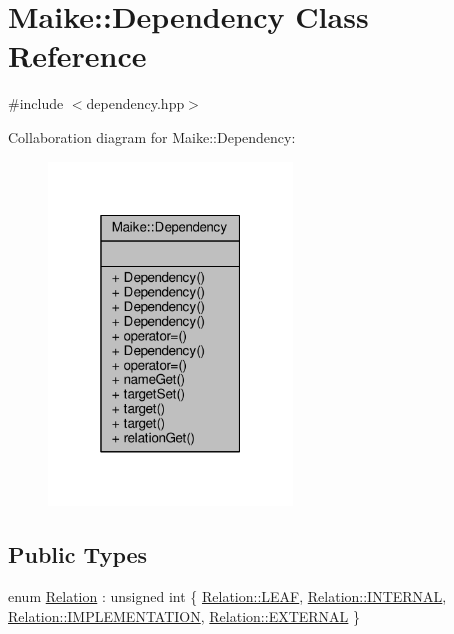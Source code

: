 \hypertarget{class_maike_1_1_dependency}{}\section{Maike\+:\+:Dependency Class Reference}
\label{class_maike_1_1_dependency}


{\ttfamily \#include $<$dependency.\+hpp$>$}



Collaboration diagram for Maike\+:\+:Dependency\+:\nopagebreak
\begin{figure}[H]
\begin{center}
\leavevmode
\includegraphics[width=184pt]{class_maike_1_1_dependency__coll__graph}
\end{center}
\end{figure}
\subsection*{Public Types}
\begin{DoxyCompactItemize}
\item 
enum \hyperlink{class_maike_1_1_dependency_a1b670303409ad2240f246e2a2c55d380}{Relation} \+: unsigned int \{ \hyperlink{class_maike_1_1_dependency_a1b670303409ad2240f246e2a2c55d380a5c19bc679506425e481a34caff777350}{Relation\+::\+L\+E\+AF}, 
\hyperlink{class_maike_1_1_dependency_a1b670303409ad2240f246e2a2c55d380a182fa1c42a2468f8488e6dcf75a81b81}{Relation\+::\+I\+N\+T\+E\+R\+N\+AL}, 
\hyperlink{class_maike_1_1_dependency_a1b670303409ad2240f246e2a2c55d380a8721d9c72777f66c96863a998e48adc3}{Relation\+::\+I\+M\+P\+L\+E\+M\+E\+N\+T\+A\+T\+I\+ON}, 
\hyperlink{class_maike_1_1_dependency_a1b670303409ad2240f246e2a2c55d380a3932d629fb5e2be9d09b3a4485b3cc9d}{Relation\+::\+E\+X\+T\+E\+R\+N\+AL}
 \}
\end{DoxyCompactItemize}
